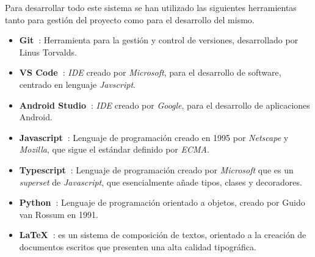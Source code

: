 Para desarrollar todo este sistema se han utilizado las siguientes herramientas tanto para gestión del proyecto como para el desarrollo del mismo.
\begin{itemize}
    \item \textbf{Git~\cite{git}}: Herramienta para la gestión y control de versiones, desarrollado por Linus Torvalds.
    
    \item \textbf{VS Code~\cite{code}}: \textit{IDE} creado por \textit{Microsoft}, para el desarrollo de software, centrado en lenguaje \textit{Javscript}.
    
    \item \textbf{Android Studio~\cite{android_studio}}: \textit{IDE} creado por \textit{Google}, para el desarrollo de aplicaciones Android.
    
    \item \textbf{Javascript~\cite{javascript}}: Lenguaje de programación creado en 1995 por \textit{Netscape} y \textit{Mozilla}, que sigue el estándar definido por \textit{ECMA}.
    
    \item \textbf{Typescript~\cite{typescript}}: Lenguaje de programación creado por \textit{Microsoft} que es un \textit{superset} de \textit{Javascript}, que esencialmente añade tipos, clases y decoradores.
    
    \item \textbf{Python~\cite{python}}: Lenguaje de programación orientado a objetos, creado por Guido van Rossum en 1991. 
    
    \item \textbf{LaTeX~\cite{latex}}: es un sistema de composición de textos, orientado a la creación de documentos escritos que presenten una alta calidad tipográfica.
    
    
\end{itemize}
